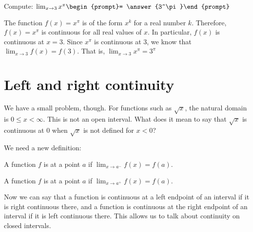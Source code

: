 \documentclass{ximera}
\begin{document}
\begin{question}
  Compute:
  $\lim_{x\to 3} x^\pi \begin{prompt}= \answer{3^\pi}\end{prompt}$
  \begin{feedback}
    The function $f(x)=x^\pi$ is of the form $x^k$ for a real number
    $k$.  Therefore, $f(x)=x^\pi$ is continuous for all real values of
    $x$.  In particular, $f(x)$ is continuous at $x=3$.  Since $x^\pi$
    is continuous at $3$, we know that $\lim_{x\to 3} f(x) = f(3)$.
    That is, $\lim_{x\to 3} x^\pi = 3^\pi$
  \end{feedback}  
\end{question}

\section{Left and right continuity}


We have a small problem, though.  For functions such as $\sqrt{x}$,
the natural domain is $0\leq x <\infty$.  This is not an open
interval.  What does it mean to say that $\sqrt{x}$ is continuous at
$0$ when $\sqrt{x}$ is not defined for $x<0$?

We need a new definition:

\begin{definition}
  A function $f$ is  at a point $a$ if
  $\lim_{x\to a^-} f(x) = f(a)$.

  A function $f$ is  at a point $a$ if
  $\lim_{x\to a^+} f(x) = f(a)$.
\end{definition}

Now we can say that a function is continuous at a left endpoint of an
interval if it is right continuous there, and a function is continuous
at the right endpoint of an interval if it is left continuous
there. This allows us to talk about continuity on closed intervals.
\end{document}
